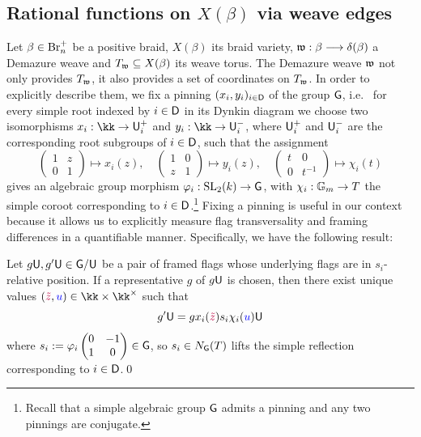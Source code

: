 \subsection{Rational functions on $X(\beta)$ via weave edges}\label{ssec:rational_functions} Let $\beta\in\mbox{Br}_n^+$ be a positive braid, $X(\beta)$ its braid variety, $\mathfrak{w}:\beta\longrightarrow\delta(\beta)$ a Demazure weave and $T_{\mathfrak{w}}\subseteq X(\beta)$ its weave torus. The Demazure weave $\mathfrak{w}$ not only provides $T_{\mathfrak{w}}$, it also provides a set of coordinates on $T_{\mathfrak{w}}$. In order to explicitly describe them, we fix a pinning $(x_{i}, y_{i})_{i \in \mathsf{D}}$ of the group $\mathsf{G}$, i.e.~ for every simple root indexed by $i \in \mathsf{D}$ in its Dynkin diagram we choose two isomorphisms $x_{i}: \kk \to \uni_{i}^{+}$ and $y_{i}: \kk \to \uni_{i}^{-}$, where $\mathsf{U}_{i}^{+}$ and $\mathsf{U}_{i}^{-}$ are the corresponding root subgroups of $i \in \mathsf{D}$, such that the assignment
\[
\left(\begin{matrix} 1 & z \\ 0 & 1 \end{matrix}\right) \mapsto x_{i}(z), \quad \left(\begin{matrix} 1 & 0 \\ z & 1 \end{matrix}\right) \mapsto y_{i}(z),\quad \left(\begin{matrix} t & 0 \\ 0 & t^{-1} \end{matrix}\right) \mapsto \chi_{i}(t)
\]
gives an algebraic group morphism $\varphi_{i}: \operatorname{SL}_{2}(k) \to \mathsf{G}$, with $\chi_{i}: \mathbb{G}_m \to T$ the simple coroot corresponding to $i \in \mathsf{D}$.\footnote{Recall that a simple algebraic group $\mathsf{G}$ admits a pinning and any two pinnings are conjugate.} Fixing a pinning is useful in our context because it allows us to explicitly measure flag transversality and framing differences in a quantifiable manner. Specifically, we have the following result:

\begin{lemma}\label{lem:framing_variables}
Let $g\mathsf{U},g'\mathsf{U}\in\mathsf{G}/\mathsf{U}$ be a pair of framed flags whose underlying flags are in $s_i$-relative position. If a representative $g$ of $g\mathsf{U}$ is chosen, then there exist unique values $(\textcolor{purple}{\tilde{z}},\textcolor{blue}{u})\in\kk\times\kk^\times$ such that
$$g'\mathsf{U}=gx_{i}(\textcolor{purple}{\tilde{z}})s_{i}\chi_i(\textcolor{blue}{u})\mathsf{U}$$
where $s_{i} := \varphi_{i}\left(\begin{matrix}0 & -1 \\ 1 & 0 \end{matrix} \right)\in \mathsf{G}$, so $s_{i} \in N_{\mathsf{G}}(T)$ lifts the simple reflection corresponding to $i \in \mathsf{D}$.\qed
\end{lemma}

